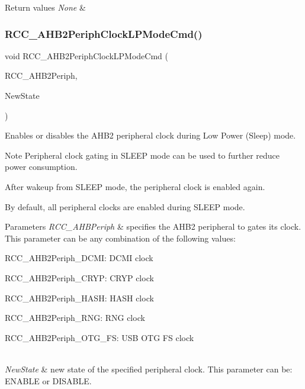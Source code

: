 \begin{DoxyRetVals}{Return values}
{\em None} & \\
\hline
\end{DoxyRetVals}
\mbox{\label{group___r_c_c_ga1ac5bb9676ae9b48e50d6a95de922ce3}} 
\subsubsection{\texorpdfstring{R\+C\+C\+\_\+\+A\+H\+B2\+Periph\+Clock\+L\+P\+Mode\+Cmd()}{RCC\_AHB2PeriphClockLPModeCmd()}}
{\footnotesize\ttfamily void R\+C\+C\+\_\+\+A\+H\+B2\+Periph\+Clock\+L\+P\+Mode\+Cmd (\begin{DoxyParamCaption}\item[{uint32\+\_\+t}]{R\+C\+C\+\_\+\+A\+H\+B2\+Periph,  }\item[{Functional\+State}]{New\+State }\end{DoxyParamCaption})}



Enables or disables the A\+H\+B2 peripheral clock during Low Power (Sleep) mode. 

\begin{DoxyNote}{Note}
Peripheral clock gating in S\+L\+E\+EP mode can be used to further reduce power consumption. 

After wakeup from S\+L\+E\+EP mode, the peripheral clock is enabled again. 

By default, all peripheral clocks are enabled during S\+L\+E\+EP mode. 
\end{DoxyNote}

\begin{DoxyParams}{Parameters}
{\em R\+C\+C\+\_\+\+A\+H\+B\+Periph} & specifies the A\+H\+B2 peripheral to gates its clock. This parameter can be any combination of the following values\+: \begin{DoxyItemize}
\item R\+C\+C\+\_\+\+A\+H\+B2\+Periph\+\_\+\+D\+C\+MI\+: D\+C\+MI clock \item R\+C\+C\+\_\+\+A\+H\+B2\+Periph\+\_\+\+C\+R\+YP\+: C\+R\+YP clock \item R\+C\+C\+\_\+\+A\+H\+B2\+Periph\+\_\+\+H\+A\+SH\+: H\+A\+SH clock \item R\+C\+C\+\_\+\+A\+H\+B2\+Periph\+\_\+\+R\+NG\+: R\+NG clock \item R\+C\+C\+\_\+\+A\+H\+B2\+Periph\+\_\+\+O\+T\+G\+\_\+\+FS\+: U\+SB O\+TG FS clock ~\newline
\end{DoxyItemize}
\\
\hline
{\em New\+State} & new state of the specified peripheral clock. This parameter can be\+: E\+N\+A\+B\+LE or D\+I\+S\+A\+B\+LE. \\
\hline
\end{DoxyParams}

